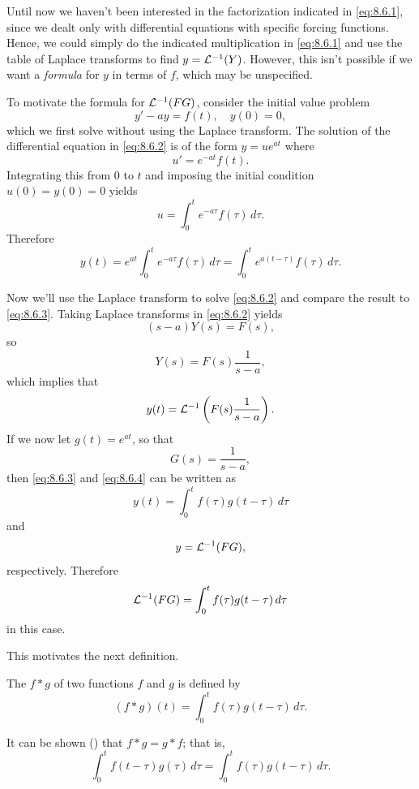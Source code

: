 Until now we haven't been interested in the factorization indicated
in \eqref{eq:8.6.1}, since we dealt only with differential equations
with specific forcing functions. Hence, we could simply do the
indicated multiplication in \eqref{eq:8.6.1} and use the table of Laplace
transforms to find $y={\mathcal L}^{-1}(Y)$. However, this isn't  possible
if we want a \emph{\color{blue}formula} for $y$ in terms of $f$, which may be
unspecified.


To motivate the formula for ${\mathcal L}^{-1}(FG)$, consider the initial
value problem
\begin{equation}\label{eq:8.6.2}
y'-ay=f(t),\quad  y(0)=0,
\end{equation}
which we first solve without using the Laplace transform.
The solution of  the differential equation in \eqref{eq:8.6.2}
is of the form $y=ue^{at}$ where
\[
u'=e^{-at}f(t).
\]
Integrating this from $0$ to $t$ and imposing the initial condition
$u(0)=y(0)=0$ yields
\[
u=\int_0^t e^{-a\tau}f(\tau)\,d\tau.
\]
Therefore
\begin{equation}\label{eq:8.6.3}
y(t)=e^{at}\int_0^t e^{-a\tau}f(\tau)\,d\tau=\int_0^t
e^{a(t-\tau)}f(\tau)\,d\tau.
\end{equation}

Now we'll use the Laplace transform to solve \eqref{eq:8.6.2}
and compare the result to \eqref{eq:8.6.3}. Taking Laplace transforms in
\eqref{eq:8.6.2} yields
\[
(s-a)Y(s)=F(s),
\]
so
\[
Y(s)=F(s) \frac{1}{s-a},
\]
which implies that
\begin{equation}\label{eq:8.6.4}
y(t)= {\mathcal L}^{-1}\left(F(s)\frac{1}{s-a}\right).
\end{equation}
If we now let $g(t)=e^{at}$, so that
\[
G(s)=\frac{1}{s-a},
\]
then \eqref{eq:8.6.3} and \eqref{eq:8.6.4} can be written as
\[
y(t)=\int_0^tf(\tau)g(t-\tau)\,d\tau
\]
and
\[
y={\mathcal L}^{-1}(FG),
\]
respectively.  Therefore
\begin{equation}\label{eq:8.6.5}
{\mathcal L}^{-1}(FG)=\int_0^t f(\tau)g(t-\tau)\,d\tau
\end{equation}
in this case.

This motivates  the next definition.

\begin{definition}\label{thmtype:8.6.1}
The 
$f*g$ of two functions $f$ and $g$ is defined by
\[
(f*g)(t)=\int_0^t f(\tau)g(t-\tau)\,d\tau.
\]
\end{definition}


It can be shown () that $f\ast g=g\ast f$;   that
is,
\[
\int_0^tf(t-\tau)g(\tau)\,d\tau=\int_0^tf(\tau)g(t-\tau)\,d\tau.
\]


